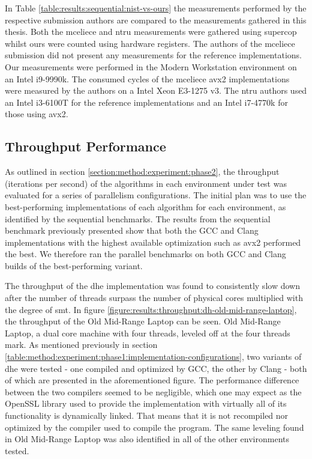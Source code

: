 In Table \ref{table:results:sequential:nist-vs-ours} the measurements performed by the respective submission authors are compared to the measurements gathered in this thesis. Both the \gls{mceliece} and \gls{ntru} measurements were gathered using \gls{supercop}~\cite{mceliece2020,ntru2020} whilst ours were counted using hardware registers. The authors of the \gls{mceliece} submission did not present any measurements for the reference implementations. Our measurements were performed in the Modern Workstation environment on an Intel i9-9990k. The consumed cycles of the \gls{mceliece} \gls{avx2} implementations were measured by the authors on a Intel Xeon E3-1275 v3. The \gls{ntru} authors used an Intel i3-6100T for the reference implementations and an Intel i7-4770k for those using \gls{avx2}.

\subsection{Throughput Performance}

As outlined in section \ref{section:method:experiment:phase2}, the throughput (iterations per second) of the algorithms in each environment under test was evaluated for a series of parallelism configurations. The initial plan was to use the best-performing implementations of each algorithm for each environment, as identified by the sequential benchmarks. The results from the sequential benchmark previously presented show that both the GCC and Clang implementations with the highest available optimization such as \gls{avx2} performed the best. We therefore ran the parallel benchmarks on both GCC and Clang builds of the best-performing variant.

The throughput of the \gls{dhe} implementation was found to consistently slow down after the number of threads surpass the number of physical cores multiplied with the degree of \gls{smt}. In figure \ref{figure:results:throughput:dh-old-mid-range-laptop}, the throughput of the Old Mid-Range Laptop can be seen. Old Mid-Range Laptop, a dual core machine with four threads, leveled off at the four threads mark. As mentioned previously in section \ref{table:method:experiment:phase1:implementation-configurations}, two variants of \gls{dhe} were tested - one compiled and optimized by GCC, the other by Clang - both of which are presented in the aforementioned figure. The performance difference between the two compilers seemed to be negligible, which one may expect as the OpenSSL library used to provide the implementation with virtually all of its functionality is dynamically linked. That means that it is not recompiled nor optimized by the compiler used to compile the program. The same leveling found in Old Mid-Range Laptop was also identified in all of the other environments tested.

